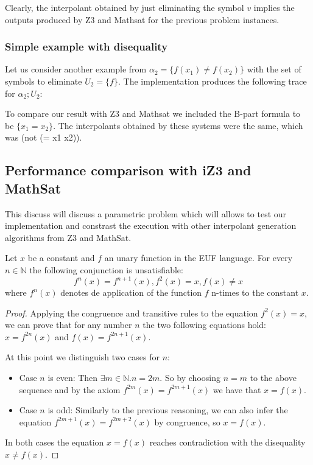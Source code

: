 Clearly, the interpolant obtained by just eliminating the symbol $v$ implies
the outputs produced by Z3 and Mathsat for the previous problem instances.

\subsubsection{Simple example with disequality}

Let us consider another example from \cite{KAPUR2017} 
$\alpha_2 = \{f(x_1) \neq f(x_2)\}$
with the set of symbols to eliminate $U_2 = \{f\}$. The implementation produces the following
trace for $\alpha_2; U_2$:



To compare our result with Z3 and Mathsat we 
included the B-part formula to be $\{x_1 = x_2\}$.
The interpolants obtained by these systems were the 
same, which was (not (= x1 x2)).

\subsection{Performance comparison with iZ3 and MathSat}

This discuss will discuss a parametric problem which will allows to test 
our implementation and constrast the execution with other interpolant generation
algorithms from Z3 and MathSat.

\begin{lemma} \label{performance_test_lemma}
  Let $x$ be a constant and $f$ an unary function in the EUF language. 
  For every $n \in \mathbb{N}$ the following conjunction is unsatisfiable:
  \begin{equation*}
    f^n(x) = f^{n+1}(x), f^2(x) = x, f(x) \neq x
  \end{equation*}
  where $f^n(x)$ denotes de application of the function $f$ n-times
  to the constant $x$.
\end{lemma}

\begin{proof}
  Applying the congruence and transitive rules to the equation $f^2(x) = x$, 
  we can prove that for any number $n$ the two following equations hold:
  $x = f^{2n}(x)$ and $f(x) = f^{2n+1}(x)$.

  At this point we distinguish two cases for $n$:

  \begin{itemize}
    \item Case $n$ is even: Then $\exists m \in \mathbb{N} . n = 2m$.
      So by choosing $n = m$ to the above sequence
      and by the axiom $f^{2m}(x) = f^{2m+1}(x)$ we have that
      $x = f(x)$.
    \item Case $n$ is odd: Similarly to the previous reasoning, 
      we can also infer the equation $f^{2m+1}(x) = f^{2m+2}(x)$
      by congruence, so $x = f(x)$.
    \end{itemize}

    In both cases the equation $x = f(x)$ reaches contradiction with the
    disequality $x \neq f(x)$.
\end{proof}

